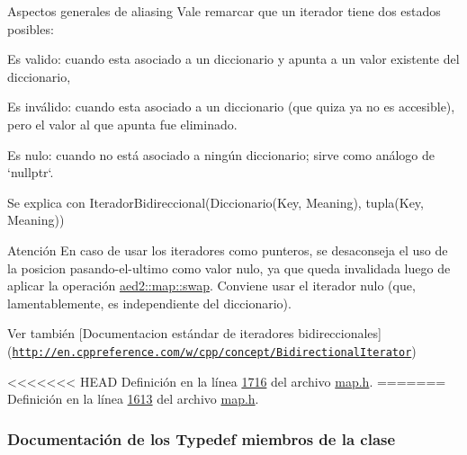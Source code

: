 \begin{Indent}
\begin{DoxyParagraph}{\-Aspectos generales de aliasing}
\-Vale remarcar que un iterador tiene dos estados posibles\-:
\begin{DoxyEnumerate}
\item \-Es valido\-: cuando esta asociado a un diccionario y apunta a un valor existente del diccionario,
\item \-Es inválido\-: cuando esta asociado a un diccionario (que quiza ya no es accesible), pero el valor al que apunta fue eliminado.
\item \-Es nulo\-: cuando no está asociado a ningún diccionario; sirve como análogo de `nullptr`. 
\end{DoxyEnumerate}
\end{DoxyParagraph}
\begin{DoxyParagraph}{\-Se explica con}
\-Iterador\-Bidireccional(\-Diccionario(\-Key, \-Meaning), tupla(\-Key, \-Meaning))
\end{DoxyParagraph}
\begin{DoxyAttention}{\-Atención}
\-En caso de usar los iteradores como punteros, se desaconseja el uso de la posicion pasando-\/el-\/ultimo como valor nulo, ya que queda invalidada luego de aplicar la operación \hyperlink{classaed2_1_1map_a43ddb71cc91e5c6021a7a1f243d6cc4a_a43ddb71cc91e5c6021a7a1f243d6cc4a}{aed2\-::map\-::swap}. \-Conviene usar el iterador nulo (que, lamentablemente, es independiente del diccionario).
\end{DoxyAttention}
\begin{DoxySeeAlso}{\-Ver también}
\mbox{[}\-Documentacion estándar de iteradores bidireccionales\mbox{]}(\href{http://en.cppreference.com/w/cpp/concept/BidirectionalIterator}{\tt http\-://en.\-cppreference.\-com/w/cpp/concept/\-Bidirectional\-Iterator}) 
\end{DoxySeeAlso}


<<<<<<< HEAD
\-Definición en la línea \hyperlink{map_8h_source_l01716}{1716} del archivo \hyperlink{map_8h_source}{map.\-h}.
=======
Definición en la línea \hyperlink{map_8h_source_l01613}{1613} del archivo \hyperlink{map_8h_source}{map.\+h}.



\subsubsection{Documentación de los \textquotesingle{}Typedef\textquotesingle{} miembros de la clase}
\mbox{\label{classaed2_1_1map_1_1iterator_a709df3d8aef6fd1eeb839616b554ff0b_a709df3d8aef6fd1eeb839616b554ff0b}} 

\end{Indent}
